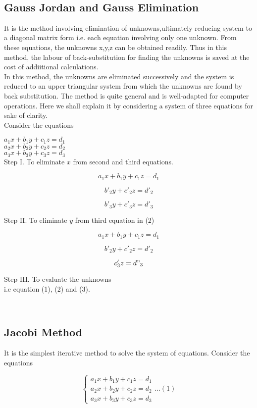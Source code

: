 \
\
\subsection{Gauss Jordan and Gauss Elimination}
It is the method involving elimination of unknowns,ultimately reducing system to a diagonal matrix form i.e. each equation involving only one unknown. From these equations, the unknowns x,y,z can be obtained readily.
Thus in this method, the labour of back-substitution for finding the unknowns is saved at the cost of addiitional calculations.\\
In this method, the unknowns are eliminated successively and the system is reduced to an upper triangular system from which the unknowns are found by back substitution. The method is quite general and is well-adapted for computer operations. Here we shall explain it by considering a system of three equations for sake of clarity.\\


\noindent Consider the equations


\noindent$a_1x+b_1y+c_1z=d_1$\\
$a_2x+b_2y+c_2z=d_2$\\
$a_3x+b_3y+c_3z=d_3$\\


Step I. To eliminate $x$ from second and third equations.

$$a_1x+b_1y+c_1z=d_1$$

$$b'_2y+c'_2z=d'_2$$

$$b'_3y+c'_3z=d'_3$$

Step II. To eliminate $y$ from third equation in (2)

$$a_1x+b_1y+c_1z=d_1$$

$$b'_2y+c'_2z=d'_2$$

$$c'_3z=d"_3$$

Step III. To evaluate the unknowns\\

i.e equation (1), (2) and (3).





\
\
\subsection{Jacobi Method}
It is the simplest iterative method to solve the system of equations.
Consider the equations

$$\begin{cases}a_1x +b_1y +c_1z =d_1\\a_2x + b_2y + c_2z=d_2\\a_3x+b_3y+c_3z=d_3\end{cases}\ldots(1)$$

